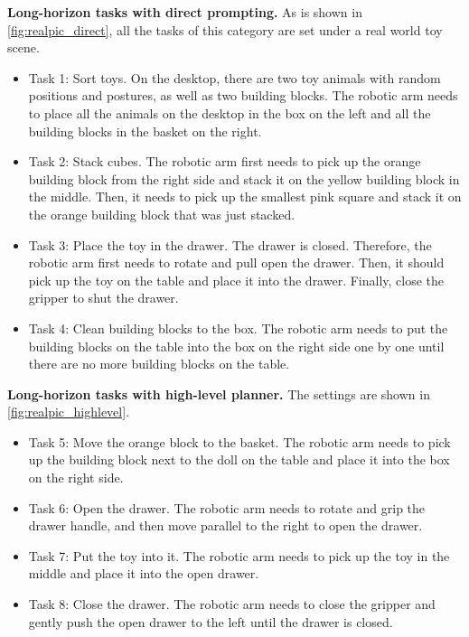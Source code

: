 \textbf{Long-horizon tasks with direct prompting.} As is shown in  \ref{fig:realpic_direct}, all the tasks of this category are set under a real world toy scene.
\begin{itemize}
    \item Task 1: Sort toys. On the desktop, there are two toy animals with random positions and postures, as well as two building blocks. The robotic arm needs to place all the animals on the desktop in the box on the left and all the building blocks in the basket on the right.
    \item  Task 2: Stack cubes. The robotic arm first needs to pick up the orange building block from the right side and stack it on the yellow building block in the middle. Then, it needs to pick up the smallest pink square and stack it on the orange building block that was just stacked.  
    \item  Task 3: Place the toy in the drawer. The drawer is closed. Therefore, the robotic arm first needs to rotate and pull open the drawer. Then, it should pick up the toy on the table and place it into the drawer. Finally, close the gripper to shut the drawer.
    \item  Task 4: Clean building blocks to the box.
 The robotic arm needs to put the building blocks on the table into the box on the right side one by one until there are no more building blocks on the table. 
\end{itemize}

\textbf{Long-horizon tasks with high-level planner.} The settings are shown in  \ref{fig:realpic_highlevel}. 

\begin{itemize}
    \item Task 5: Move the orange block to the basket. The robotic arm needs to pick up the building block next to the doll on the table and place it into the box on the right side. 
    \item Task 6: Open the drawer. The robotic arm needs to rotate and grip the drawer handle, and then move parallel to the right to open the drawer. 
    \item Task 7: Put the toy into it. The robotic arm needs to pick up the toy in the middle and place it into the open drawer. 
    \item Task 8: Close the drawer. The robotic arm needs to close the gripper and gently push the open drawer to the left until the drawer is closed. 
\end{itemize}


